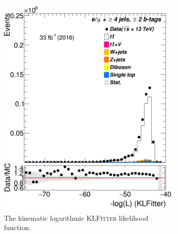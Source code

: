 \begin{figure}
\begin{subfigure}{0.25\textwidth}
	\includegraphics[width=\linewidth]{ControlPlots_emujets_2016_4incl_2incl/klf_LL_emujets_2016.png}
	\caption{The kinematic logarithmic \textsc{KLFitter} likelihood function.} \label{fig:K2}
\end{subfigure}\hspace*{0.5cm}	
	\begin{subfigure}{0.25\textwidth}

\end{subfigure}
\end{figure}
